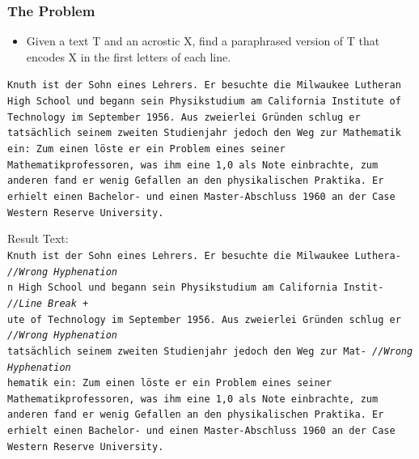 \documentclass{beamer}
\begin{document}
\begin{frame}
\frametitle{The Problem}
\begin{itemize}
\item Given a text T and an acrostic X, find a paraphrased version of T that encodes X in the first letters of each line.
\end{itemize}

\texttt{\tiny Knuth ist der Sohn eines Lehrers. Er besuchte die Milwaukee Lutheran \\
High School und begann sein Physikstudium am California Institute of \\
Technology im September 1956. Aus zweierlei Gründen schlug er \\
tatsächlich seinem zweiten Studienjahr jedoch den Weg zur Mathematik \\
ein: Zum einen löste er ein Problem eines seiner \\
Mathematikprofessoren, was ihm eine 1,0 als Note einbrachte, zum \\
anderen fand er wenig Gefallen an den physikalischen Praktika. Er \\
erhielt einen Bachelor- und einen Master-Abschluss 1960 an der Case \\
Western Reserve University. \\}

Result Text: \\

\texttt{\scriptsize{K}\tiny nuth ist der Sohn eines Lehrers. Er besuchte die Milwaukee Luthera- \hskip 18pt \emph{//Wrong Hyphenation} \\
\scriptsize{n} \tiny  High School und begann sein Physikstudium am California Instit- \hskip 33pt \emph{//Line Break +} \\
\scriptsize{u}\tiny te of Technology im September 1956. Aus zweierlei Gründen schlug er \hskip 23pt \emph{//Wrong Hyphenation} \\
\scriptsize{t}\tiny atsächlich seinem zweiten Studienjahr jedoch den Weg zur Mat- \hskip 39pt \emph{//Wrong Hyphenation} \\
\scriptsize{h}\tiny ematik ein: Zum einen löste er ein Problem eines seiner \\
Mathematikprofessoren, was ihm eine 1,0 als Note einbrachte, zum \\
anderen fand er wenig Gefallen an den physikalischen Praktika. Er \\
erhielt einen Bachelor- und einen Master-Abschluss 1960 an der Case \\
Western Reserve University. \\}
\end{frame}
\end{document}
